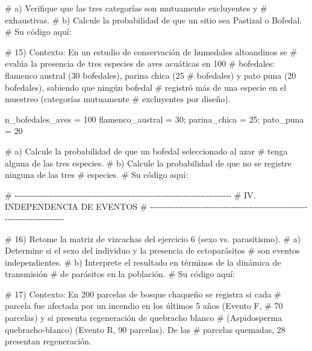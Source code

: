 \documentclass[
  spanish,
  letterpaper,
  DIV=11,
  numbers=noendperiod]{scrreprt}
\newenvironment{Shaded}{\begin{snugshade}}{\end{snugshade}}
\newcommand{\CommentTok}[1]{\textcolor[rgb]{0.37,0.37,0.37}{#1}}
\newcommand{\DecValTok}[1]{\textcolor[rgb]{0.68,0.00,0.00}{#1}}
\newcommand{\NormalTok}[1]{\textcolor[rgb]{0.00,0.23,0.31}{#1}}
\newcommand{\OtherTok}[1]{\textcolor[rgb]{0.00,0.23,0.31}{#1}}
\begin{document}
\begin{Shaded}
\begin{Highlighting}[]
\CommentTok{\#     a) Verifique que las tres categorías son mutuamente excluyentes y}
\CommentTok{\#        exhaustivas.}
\CommentTok{\#     b) Calcule la probabilidad de que un sitio sea Pastizal o Bofedal.}
\CommentTok{\# Su código aquí:}


\CommentTok{\# 15) Contexto: En un estudio de conservación de humedales altoandinos se}
\CommentTok{\#     evalúa la presencia de tres especies de aves acuáticas en 100}
\CommentTok{\#     bofedales: flamenco austral (30 bofedales), parina chica (25}
\CommentTok{\#     bofedales) y pato puna (20 bofedales), sabiendo que ningún bofedal}
\CommentTok{\#     registró más de una especie en el muestreo (categorías mutuamente}
\CommentTok{\#     excluyentes por diseño).}

\NormalTok{n\_bofedales\_aves }\OtherTok{=} \DecValTok{100}
\NormalTok{flamenco\_austral }\OtherTok{=} \DecValTok{30}\NormalTok{; parina\_chica }\OtherTok{=} \DecValTok{25}\NormalTok{; pato\_puna }\OtherTok{=} \DecValTok{20}

\CommentTok{\#     a) Calcule la probabilidad de que un bofedal seleccionado al azar}
\CommentTok{\#        tenga alguna de las tres especies.}
\CommentTok{\#     b) Calcule la probabilidad de que no se registre ninguna de las tres}
\CommentTok{\#        especies.}
\CommentTok{\# Su código aquí:}


\CommentTok{\# {-}{-}{-}{-}{-}{-}{-}{-}{-}{-}{-}{-}{-}{-}{-}{-}{-}{-}{-}{-}{-}{-}{-}{-}{-}{-}{-}{-}{-}{-}{-}{-}{-}{-}{-}{-}{-}{-}{-}{-}{-}{-}{-}{-}{-}{-}{-}{-}{-}{-}{-}{-}{-}{-}{-}{-}{-}{-}{-}{-}{-}{-}{-}{-}{-}{-}{-}{-}{-}{-}{-}{-}{-}{-}{-}{-}{-}}
\CommentTok{\# IV. INDEPENDENCIA DE EVENTOS}
\CommentTok{\# {-}{-}{-}{-}{-}{-}{-}{-}{-}{-}{-}{-}{-}{-}{-}{-}{-}{-}{-}{-}{-}{-}{-}{-}{-}{-}{-}{-}{-}{-}{-}{-}{-}{-}{-}{-}{-}{-}{-}{-}{-}{-}{-}{-}{-}{-}{-}{-}{-}{-}{-}{-}{-}{-}{-}{-}{-}{-}{-}{-}{-}{-}{-}{-}{-}{-}{-}{-}{-}{-}{-}{-}{-}{-}{-}{-}{-}}

\CommentTok{\# 16) Retome la matriz de vizcachas del ejercicio 6 (sexo vs. parasitismo).}
\CommentTok{\#     a) Determine si el sexo del individuo y la presencia de ectoparásitos}
\CommentTok{\#        son eventos independientes.}
\CommentTok{\#     b) Interprete el resultado en términos de la dinámica de transmisión}
\CommentTok{\#        de parásitos en la población.}
\CommentTok{\# Su código aquí:}


\CommentTok{\# 17) Contexto: En 200 parcelas de bosque chaqueño se registra si cada}
\CommentTok{\#     parcela fue afectada por un incendio en los últimos 5 años (Evento F,}
\CommentTok{\#     70 parcelas) y si presenta regeneración de quebracho blanco}
\CommentTok{\#     (Aspidosperma quebracho{-}blanco) (Evento R, 90 parcelas). De las}
\CommentTok{\#     parcelas quemadas, 28 presentan regeneración.}


\end{Highlighting}
\end{Shaded}
\end{document}
